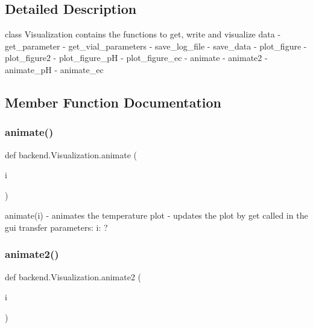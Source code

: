 \subsection{Detailed Description}
\begin{DoxyVerb}class Visualization contains the functions to get, write and visualize data
    - get_parameter
    - get_vial_parameters
    - save_log_file
    - save_data
    - plot_figure
    - plot_figure2
    - plot_figure_pH
    - plot_figure_ec
    - animate
    - animate2
    - animate_pH
    - animate_ec
\end{DoxyVerb}
 

\subsection{Member Function Documentation}
\mbox{\label{classbackend_1_1Visualization_a8786183f4482b87a89c80d7163ec8038_a8786183f4482b87a89c80d7163ec8038}} 
\subsubsection{\texorpdfstring{animate()}{animate()}}
{\footnotesize\ttfamily def backend.\+Visualization.\+animate (\begin{DoxyParamCaption}\item[{}]{i }\end{DoxyParamCaption})}

\begin{DoxyVerb}animate(i)
    - animates the temperature plot
    - updates the plot by get called in the gui
transfer parameters:
    i: ?
\end{DoxyVerb}
 \mbox{\label{classbackend_1_1Visualization_a5c623da4f55407d6f6838bc85cb0b57b_a5c623da4f55407d6f6838bc85cb0b57b}} 
\subsubsection{\texorpdfstring{animate2()}{animate2()}}
{\footnotesize\ttfamily def backend.\+Visualization.\+animate2 (\begin{DoxyParamCaption}\item[{}]{i }\end{DoxyParamCaption})}

